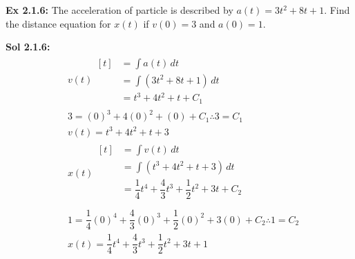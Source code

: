 \begin{tcolorbox}[example]
    \textbf{Ex 2.1.6: } The acceleration of particle is described by $a(t) = 3t^2 + 8t + 1$. Find the distance equation for $x(t)$ if $v(0) = 3$ and $a(0) = 1$.
\end{tcolorbox}
\begin{tcolorbox}[solution]
    \textbf{Sol 2.1.6: } \begin{align*}
        & v(t) \begin{aligned}[t]
            & = \int a(t) \, dt \\[11pt]
            & = \int \left(3t^2 + 8t + 1\right) \, dt \\[11pt]
            & = t^3 + 4t^2 + t + C_1 
        \end{aligned} \\[11pt]
        & 3 = (0)^3 + 4(0)^2 + (0) + C_1 \therefore 3 = C_1 \\[11pt]
        & v(t) = t^3 + 4t^2 + t + 3 \\[11pt]
        & x(t) \begin{aligned}[t]
            & = \int v(t) \, dt \\[11pt]
            & = \int \left(t^3 + 4t^2 + t + 3\right) \, dt \\[11pt]
            & = \dfrac{1}{4}t^4 + \dfrac{4}{3}t^3 + \dfrac{1}{2}t^2 + 3t + C_2 \\[11pt]
        \end{aligned} \\[11pt]
        & 1 = \dfrac{1}{4}(0)^4 + \dfrac{4}{3}(0)^3 + \dfrac{1}{2}(0)^2 + 3(0) + C_2 \therefore 1 = C_2 \\[11pt]
        & \boxed{x(t) = \dfrac{1}{4}t^4 + \dfrac{4}{3}t^3 + \dfrac{1}{2}t^2 + 3t + 1}
    \end{align*}
\end{tcolorbox} \vspace{11pt}

